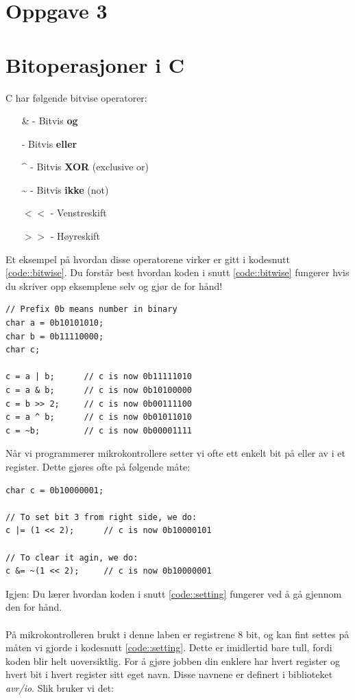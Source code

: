 \documentclass[11pt,a4paper]{article}
\begin{document}
\section{Oppgave 3}

\newpage
\noindent
\appendix
\section{Bitoperasjoner i C}
\label{Bitwise::in::C}
C har følgende bitvise operatorer:
\begin{itemize}
\item[\&] - Bitvis \textbf{og}
\item[\textbar] - Bitvis \textbf{eller}
\item[\textasciicircum] - Bitvis \textbf{XOR} (exclusive or)
\item[\textasciitilde] - Bitvis \textbf{ikke} (not)
\item[$<<$] - Venstreskift
\item[$>>$] - Høyreskift
\end{itemize}
Et eksempel på hvordan disse operatorene virker er gitt i kodesnutt \ref{code::bitwise}. Du forstår best hvordan koden i snutt \ref{code::bitwise} fungerer hvis du skriver opp eksemplene selv og gjør de for hånd!
\begin{lstlisting}[caption=Bitvise operatorer i C.,label=code::bitwise]
// Prefix 0b means number in binary
char a = 0b10101010;
char b = 0b11110000;
char c;

c = a | b;		// c is now 0b11111010
c = a & b;		// c is now 0b10100000
c = b >> 2;		// c is now 0b00111100
c = a ^ b;		// c is now 0b01011010
c = ~b;			// c is now 0b00001111
\end{lstlisting}
Når vi programmerer mikrokontrollere setter vi ofte ett enkelt bit på eller av i et register. Dette gjøres ofte på følgende måte:
\begin{lstlisting}[caption=Setting av enkelte bit.,label=code::setting]
char c = 0b10000001;

// To set bit 3 from right side, we do:
c |= (1 << 2);		// c is now 0b10000101

// To clear it agin, we do:
c &= ~(1 << 2);		// c is now 0b10000001
\end{lstlisting}
Igjen: Du lærer hvordan koden i snutt \ref{code::setting} fungerer ved å gå gjennom den for hånd.\\
\\
På mikrokontrolleren brukt i denne laben er registrene 8 bit, og kan fint settes på måten vi gjorde i kodesnutt \ref{code::setting}. Dette er imidlertid bare tull, fordi koden blir helt uoversiktlig. For å gjøre jobben din enklere har hvert register og hvert bit i hvert register sitt eget navn. Disse navnene er definert i biblioteket \textit{avr/io}. Slik bruker vi det:
\end{document}
